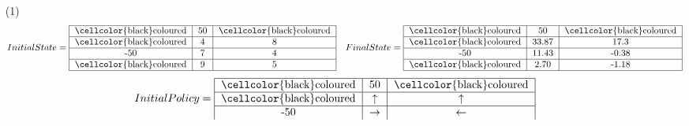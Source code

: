 \documentclass[letter, 10pt]{article}
\begin{document}
\begin{itemize}
    \item[(1)] \begin{equation*}
                    Initial State = \begin{tabular}{ |c|c|c| } 
                                    \hline
                                    \cellcolor{black}coloured & 50 & \cellcolor{black}coloured\\
                                    \hline
                                    \cellcolor{black}coloured & 4 & 8\\
                                    \hline
                                    -50 & 7 & 4\\
                                    \hline
                                    \cellcolor{black}coloured & 9 & 5\\
                                    \hline
                                    \end{tabular}\quad 
                    Final State =   \begin{tabular}{ |c|c|c| } 
                                    \hline
                                    \cellcolor{black}coloured & 50 & \cellcolor{black}coloured\\
                                    \hline
                                    \cellcolor{black}coloured & 33.87 & 17.3\\
                                    \hline
                                    -50 & 11.43 & -0.38\\
                                    \hline
                                    \cellcolor{black}coloured & 2.70 & -1.18\\
                                    \hline
                                    \end{tabular}
                \end{equation*}
                \begin{equation*}
                    Initial Policy = \begin{tabular}{ |c|c|c| } 
                                    \hline
                                    \cellcolor{black}coloured & 50 & \cellcolor{black}coloured\\
                                    \hline
                                    \cellcolor{black}coloured & $\uparrow$ & $\uparrow$\\
                                    \hline
                                    -50 & $\rightarrow$ & $\leftarrow$\\

\end{tabular}
\end{equation*}
\end{itemize}
\end{document}
